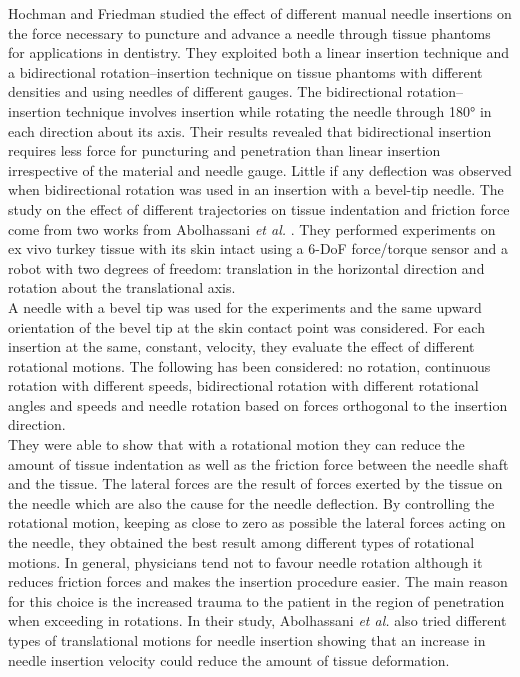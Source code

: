 Hochman and Friedman\cite{MEIKLEJOHN1987} studied the effect of different manual needle insertions on the force necessary to puncture and advance a needle through tissue phantoms for applications in dentistry. They exploited both a linear insertion technique and a bidirectional rotation–insertion technique on tissue phantoms with different densities and using needles of different gauges. The bidirectional rotation–insertion technique involves insertion while rotating the needle through 180° in each direction about its axis. Their results revealed that bidirectional insertion requires less force for puncturing and penetration than linear insertion irrespective of the material and needle gauge.
Little if any deflection was observed when bidirectional rotation was used in an insertion with a bevel-tip needle. 
The study on the effect of different trajectories on tissue indentation and friction force come from two works from Abolhassani \textit{et al.} \cite{AbolhassaniRoboticsNeedle2004}\cite{Abolhassani2004}.
They performed experiments on ex vivo turkey tissue with its skin intact using a 6-DoF force/torque sensor and a robot with two degrees of freedom: translation in the horizontal direction and rotation about the translational axis.\\
A needle with a bevel tip was used for the experiments and the same upward orientation of the bevel tip at the skin contact point was considered. For each insertion at the same, constant, velocity, they evaluate the effect of different rotational motions. The following has been considered: no rotation, continuous rotation with different speeds, bidirectional rotation with different rotational angles and speeds and needle rotation based on forces orthogonal to the insertion direction.\\
They were able to show that with a rotational motion they can reduce the amount of tissue indentation as well as the friction force between the needle shaft and the tissue.
The lateral forces are the result of forces exerted by the tissue on the needle which are also the cause for the needle deflection. By controlling the rotational motion, keeping as close to zero as possible the lateral forces acting on the needle, they obtained the best result among different types of rotational motions.
In general, physicians tend not to favour needle rotation although it reduces friction forces and makes the insertion procedure easier. The main reason for this choice is the increased trauma to the patient in the region of penetration when exceeding in rotations. In their study, Abolhassani \textit{et al.} also tried different types of translational motions for needle insertion showing that an increase in needle insertion velocity could reduce the amount of tissue deformation.

